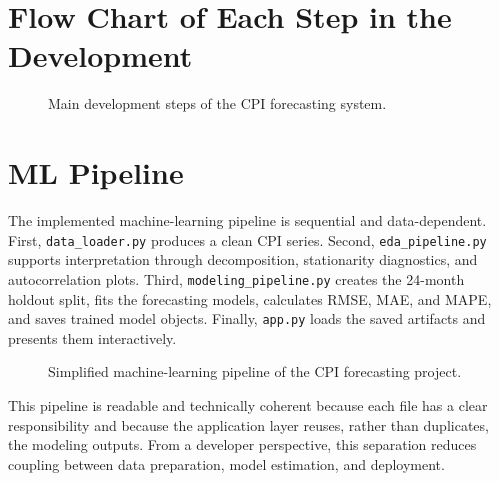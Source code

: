 \section{Flow Chart of Each Step in the Development}

\begin{figure}[H]
	\centering
	
	\caption{Main development steps of the CPI forecasting system.}
	\label{fig:dev_flowchart}
\end{figure}

\section{ML Pipeline}

The implemented machine-learning pipeline is sequential and data-dependent. First, \texttt{data\_loader.py} produces a clean CPI series. Second, \texttt{eda\_pipeline.py} supports interpretation through decomposition, stationarity diagnostics, and autocorrelation plots. Third, \texttt{modeling\_pipeline.py} creates the 24-month holdout split, fits the forecasting models, calculates RMSE, MAE, and MAPE, and saves trained model objects. Finally, \texttt{app.py} loads the saved artifacts and presents them interactively.

\begin{figure}[H]
	\centering
	
	\caption{Simplified machine-learning pipeline of the CPI forecasting project.}
	\label{fig:ml_pipeline}
\end{figure}

This pipeline is readable and technically coherent because each file has a clear responsibility and because the application layer reuses, rather than duplicates, the modeling outputs. From a developer perspective, this separation reduces coupling between data preparation, model estimation, and deployment.
